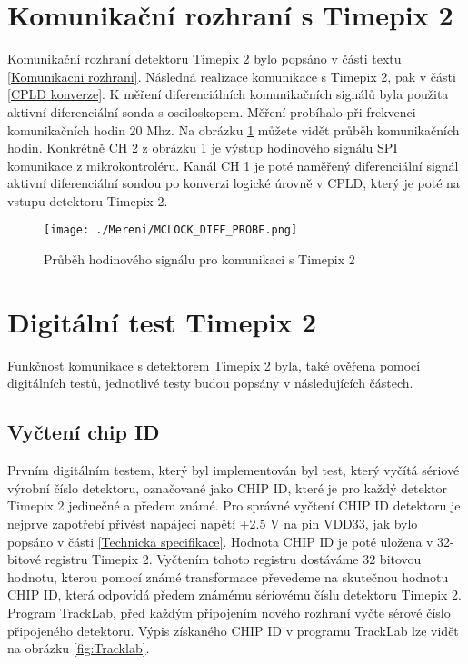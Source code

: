 \section{Komunikační rozhraní s Timepix 2}		%
Komunikační rozhraní detektoru Timepix 2 bylo popsáno v části textu \ref{Komunikacni rozhrani}. Následná  realizace komunikace s Timepix 2, pak v části \ref{CPLD konverze}. K měření diferenciálních komunikačních signálů byla použita aktivní diferenciální sonda s osciloskopem. Měření probíhalo při frekvenci komunikačních hodin 20 Mhz. Na obrázku \ref{fig:MCLOCK_DIFF_PROBE} můžete vidět průběh komunikačních hodin. Konkrétně CH 2 z obrázku \ref{fig:MCLOCK_DIFF_PROBE} je výstup hodinového signálu SPI komunikace z mikrokontroléru. Kanál CH 1 je poté naměřený diferenciální signál aktivní diferenciální sondou po konverzi logické úrovně v CPLD, který je poté na vstupu detektoru Timepix 2.  
\begin{figure}[h!]
	\centering
	\captionsetup{justification=centering}
	\texttt{[image: ./Mereni/MCLOCK\_DIFF\_PROBE.png]}
	\caption{Průběh hodinového signálu pro komunikaci s Timepix 2} 
	\label{fig:MCLOCK_DIFF_PROBE}
\end{figure}

\section{Digitální test Timepix 2} %
Funkčnost komunikace s detektorem Timepix 2 byla, také ověřena pomocí digitálních testů, jednotlivé testy budou popsány v následujících částech.
	\subsection{Vyčtení chip ID}
	Prvním digitálním testem, který byl implementován byl test, který vyčítá sériové výrobní číslo detektoru, označované jako CHIP ID, které je pro každý detektor Timepix 2 jedinečné a předem známé. Pro správné vyčtení CHIP ID detektoru je nejprve zapotřebí přivést napájecí napětí +2.5 V na pin VDD33, jak bylo popsáno v části \ref{Technicka specifikace}. Hodnota CHIP ID je poté uložena v 32-bitové registru Timepix 2. Vyčtením tohoto registru dostáváme 32 bitovou hodnotu, kterou pomocí známé transformace převedeme na skutečnou hodnotu CHIP ID, která odpovídá předem známému sériovému číslu detektoru Timepix 2. Program TrackLab, před každým připojením nového rozhraní vyčte sérové číslo připojeného detektoru. Výpis získaného CHIP ID v programu TrackLab lze vidět na obrázku \ref{fig:Tracklab}.

